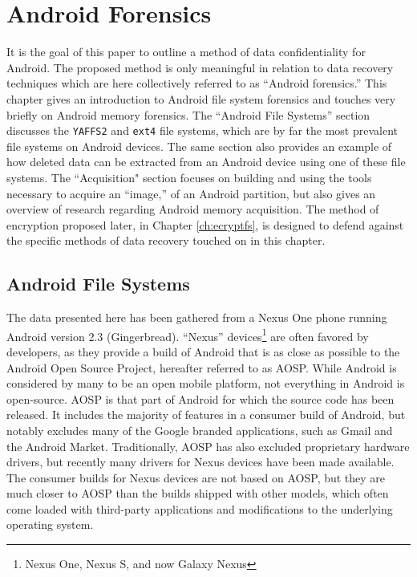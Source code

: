 \chapter{Android Forensics}
\label{ch:forensics}
It is the goal of this paper to outline a method of data confidentiality for Android. The proposed method is only meaningful in
relation to data recovery techniques which are here collectively referred to as ``Android forensics.'' This chapter gives an
introduction to Android file system forensics and touches very briefly on Android memory forensics.  The ``Android File Systems''
section discusses the \texttt{YAFFS2} and \texttt{ext4} file systems, which are by far the most prevalent file systems on Android
devices. The same section also provides an example of how deleted data can be extracted from an Android device using one of
these file systems.  The ``Acquisition" section focuses on building and using the tools necessary to acquire an ``image,'' of an
Android partition, but also gives an overview of research regarding Android memory acquisition. The method of encryption proposed
later, in Chapter \ref{ch:ecryptfs}, is designed to defend against the specific methods of data recovery touched on in this
chapter.

\section{Android File Systems}

The data presented here has been gathered from a Nexus One phone running Android version 2.3 (Gingerbread).  ``Nexus''
devices\footnote{Nexus One, Nexus S, and now Galaxy Nexus} are often favored by developers, as they provide a build of Android that
is as close as possible to the Android Open Source Project, hereafter referred to as AOSP. While Android is considered by many to be
an open mobile platform, not everything in Android is open-source. AOSP is that part of Android for which the source code has been
released.  It includes the majority of features in a consumer build of Android, but notably excludes many of the Google branded
applications, such as Gmail and the Android Market. Traditionally, AOSP has also excluded proprietary hardware drivers, but recently
many drivers for Nexus devices have been made available.  The consumer builds for Nexus devices are not based on AOSP, but they
are much closer to AOSP than the builds shipped with other models, which often come loaded with third-party applications and
modifications to the underlying operating system.

